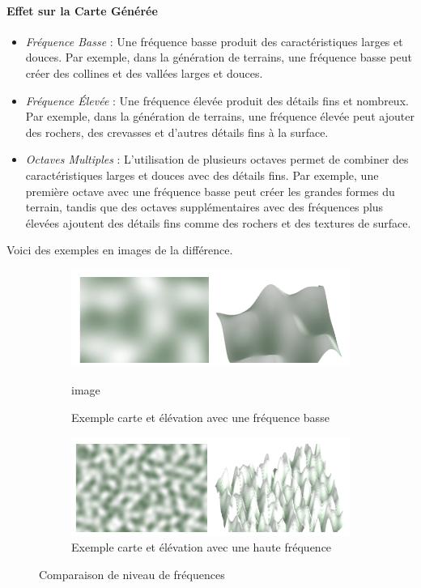     \paragraph{Effet sur la Carte Générée}
    \begin{itemize}
        \item \textit{Fréquence Basse} : Une fréquence basse produit des caractéristiques larges et douces. Par exemple, dans la génération de terrains, une fréquence basse peut créer des collines et des vallées larges et douces.
        \item \textit{Fréquence Élevée} : Une fréquence élevée produit des détails fins et nombreux. Par exemple, dans la génération de terrains, une fréquence élevée peut ajouter des rochers, des crevasses et d'autres détails fins à la surface.
        \item \textit{Octaves Multiples} : L'utilisation de plusieurs octaves permet de combiner des caractéristiques larges et douces avec des détails fins. Par exemple, une première octave avec une fréquence basse peut créer les grandes formes du terrain, tandis que des octaves supplémentaires avec des fréquences plus élevées ajoutent des détails fins comme des rochers et des textures de surface.
    \end{itemize}
    \newpage
    Voici des exemples en images de la différence.

    \begin{figure}[!h]
    \centering
    \begin{subfigure}{0.4\linewidth}
        \centering
        \includegraphics[width=\linewidth]{images/low_frequency.png}
        \caption{Exemple carte et élévation avec une fréquence basse}
        \label{fig:image_avant_expansion}image
    \end{subfigure}
    \hfill
    \begin{subfigure}{0.4\linewidth}
        \centering
        \includegraphics[width=\linewidth]{images/hight_frequency.png}
        \caption{Exemple carte et élévation avec une haute fréquence}
        \label{fig:histo_avant_expansion}
    \end{subfigure}
    \caption{Comparaison de niveau de fréquences}
\end{figure}

